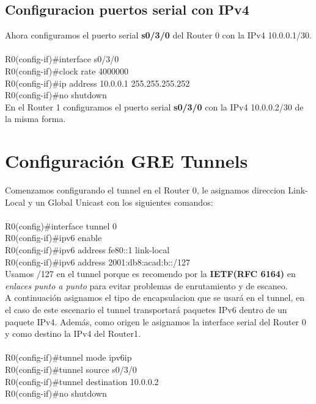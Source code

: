 \documentclass[a4paper,12pt]{article}
\begin{document}
\subsection{Configuracion puertos serial con IPv4}
Ahora configuramos el puerto serial \textbf{s0/3/0} del Router 0 con la IPv4 10.0.0.1/30.\\
\noindent\\
R0(config-if)\#interface s0/3/0\\
R0(config-if)\#clock rate 4000000\\
R0(config-if)\#ip address 10.0.0.1 255.255.255.252\\
R0(config-if)\#no shutdown\\

En el Router 1 configuramos el puerto serial \textbf{s0/3/0} con la IPv4 10.0.0.2/30 de la misma forma.\\

\section{Configuración GRE Tunnels}
Comenzamos configurando el tunnel en el Router 0, le asignamos direccion Link-Local y un Global Unicast con los siguientes comandos:\\
\noindent\\
R0(config)\#interface tunnel 0\\
R0(config-if)\#ipv6 enable\\
R0(config-if)\#ipv6 address fe80::1 link-local\\
R0(config-if)\#ipv6 address 2001:db8:acad:b::/127\\

Usamos /127 en el tunnel porque es recomendo por la \textbf{IETF(RFC 6164)} en \textit{enlaces punto a punto} para evitar problemas de enrutamiento y de escaneo.\\
A continuación asignamos el tipo de encapsulacion que se usará en el tunnel, en el caso de este escenario el tunnel transportará paquetes IPv6 dentro de un paquete IPv4. Además, como origen le asignamos la interface serial del Router 0 y como destino la IPv4 del Router1.\\

\noindent\\
R0(config-if)\#tunnel mode ipv6ip\\
R0(config-if)\#tunnel source s0/3/0\\
R0(config-if)\#tunnel destination 10.0.0.2\\
R0(config-if)\#no shutdown\\
\end{document}
